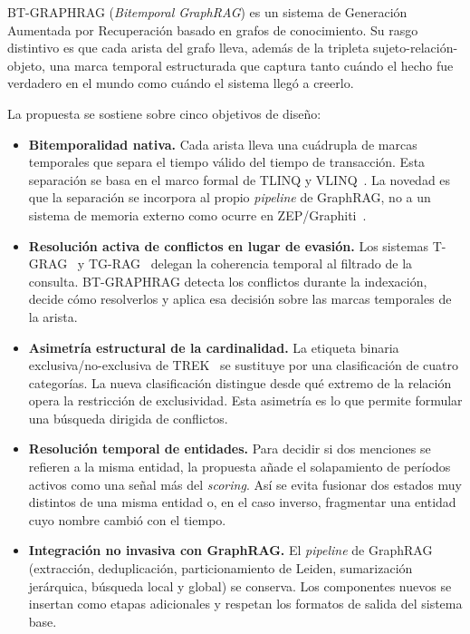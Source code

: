 BT-GRAPHRAG (\emph{Bitemporal GraphRAG}) es un sistema de Generación Aumentada por Recuperación basado en grafos de conocimiento. Su rasgo distintivo es que cada arista del grafo lleva, además de la tripleta sujeto-relación-objeto, una marca temporal estructurada que captura tanto cuándo el hecho fue verdadero en el mundo como cuándo el sistema llegó a creerlo.

La propuesta se sostiene sobre cinco objetivos de diseño:

\begin{itemize}
    \item \textbf{Bitemporalidad nativa.} Cada arista lleva una cuádrupla de marcas temporales que separa el tiempo válido del tiempo de transacción. Esta separación se basa en el marco formal de TLINQ y VLINQ~\cite{tlinq_vlinq_placeholder}. La novedad es que la separación se incorpora al propio \emph{pipeline} de GraphRAG, no a un sistema de memoria externo como ocurre en ZEP/Graphiti~\cite{zep2025}.
    \item \textbf{Resolución activa de conflictos en lugar de evasión.} Los sistemas T-GRAG~\cite{tgrag2025} y TG-RAG~\cite{tg_rag2025} delegan la coherencia temporal al filtrado de la consulta. BT-GRAPHRAG detecta los conflictos durante la indexación, decide cómo resolverlos y aplica esa decisión sobre las marcas temporales de la arista.
    \item \textbf{Asimetría estructural de la cardinalidad.} La etiqueta binaria exclusiva/no-exclusiva de TREK~\cite{trek2025} se sustituye por una clasificación de cuatro categorías. La nueva clasificación distingue desde qué extremo de la relación opera la restricción de exclusividad. Esta asimetría es lo que permite formular una búsqueda dirigida de conflictos.
    \item \textbf{Resolución temporal de entidades.} Para decidir si dos menciones se refieren a la misma entidad, la propuesta añade el solapamiento de períodos activos como una señal más del \emph{scoring}. Así se evita fusionar dos estados muy distintos de una misma entidad o, en el caso inverso, fragmentar una entidad cuyo nombre cambió con el tiempo.
    \item \textbf{Integración no invasiva con GraphRAG.} El \emph{pipeline} de GraphRAG~\cite{edge2024local} (extracción, deduplicación, particionamiento de Leiden, sumarización jerárquica, búsqueda local y global) se conserva. Los componentes nuevos se insertan como etapas adicionales y respetan los formatos de salida del sistema base.
\end{itemize}

